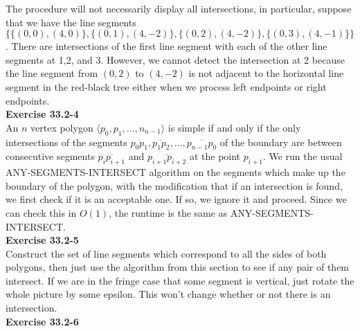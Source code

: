 \documentclass{article}
\begin{document}
The procedure will not necessarily display all intersections, in particular, suppose that we have the line segments $\{\{(0,0),(4,0)\},\{(0,1),(4,-2)\},\{(0,2),(4,-2)\},\{(0,3),(4,-1)\}\}$. There are intersections of the first line segment with each of the other line segments at 1,2, and 3. However, we cannot detect the intersection at 2 because the line segment from $(0,2)$ to $(4,-2)$ is not adjacent to the horizontal line segment in the red-black tree either when we process left endpoints or right endpoints.\\

\noindent\textbf{Exercise 33.2-4}\\

An $n$ vertex polygon $\langle p_0,p_1,\ldots,n_{n-1}\rangle$ is simple if and only if the only intersections of the segments $\overline{p_0 p_1}, \overline{p_1 p_2}, \ldots, \overline{p_{n-1}p_0}$ of the boundary are between consecutive segments $\overline{p_{i}p_{i+1}}$ and $\overline{p_{i+1}p_{i+2}}$ at the point $p_{i+1}$.   We run the usual ANY-SEGMENTS-INTERSECT algorithm on the segments which make up the boundary of the polygon, with the modification that if an intersection is found, we first check if it is an acceptable one. If so, we ignore it and proceed.  Since we can check this in $O(1)$, the runtime is the same as ANY-SEGMENTS-INTERSECT.
\\


\noindent\textbf{Exercise 33.2-5}\\
Construct the set of line segments which correspond to all the sides of both polygons, then just use the algorithm from this section to see if any pair of them intersect. If we are in the fringe case that some segment is vertical, just rotate the whole picture by some epsilon. This won't change whether or not there is an intersection.\\




\noindent\textbf{Exercise 33.2-6}\\
\end{document}
